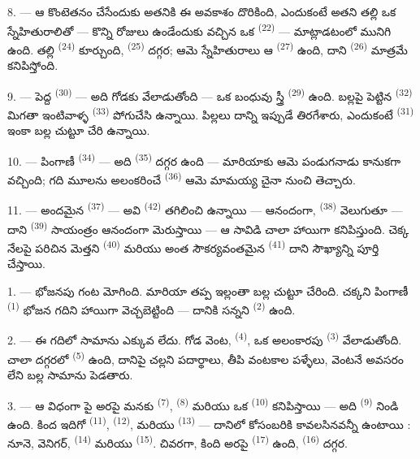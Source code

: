 8. --- ఆ కొంటెతనం చేసేందుకు అతనికి ఈ అవకాశం దొరికింది, ఎందుకంటే అతని తల్లి ఒక స్నేహితురాలితో —
కొన్ని రోజులు ఉండేందుకు వచ్చిన ఒక  \textsuperscript{(22)} — మాట్లాడటంలో మునిగి
ఉంది. తల్లి  \textsuperscript{(24)} కూర్చుంది, 
\textsuperscript{(25)} దగ్గర; ఆమె స్నేహితురాలు ఆ  \textsuperscript{(27)}
ఉంది, దాని  \textsuperscript{(26)} మాత్రమే కనిపిస్తోంది.

9. --- పెద్ద  \textsuperscript{(30)} — అది గోడకు వేలాడుతోంది — ఒక బంధువు
స్త్రీ  \textsuperscript{(29)} ఉంది. బల్లపై పెట్టిన 
\textsuperscript{(32)} మిగతా ఇంటివాళ్ళ  \textsuperscript{(33)} పోగుచేసి
ఉన్నాయి. పిల్లలు దాన్ని ఇప్పుడే తిరగేశారు, ఎందుకంటే  \textsuperscript{(31)}
ఇంకా బల్ల చుట్టూ చేరి ఉన్నాయి.

10. --- పింగాణీ  \textsuperscript{(34)} — అది 
\textsuperscript{(35)} దగ్గర ఉంది — మారియాకు ఆమె పండుగనాడు కానుకగా వచ్చింది; గది మూలను
అలంకరించే  \textsuperscript{(36)} ఆమె మామయ్య చైనా నుంచి తెచ్చారు.

11. --- అందమైన  \textsuperscript{(37)} — అవి 
\textsuperscript{(42)} తగిలించి ఉన్నాయి — ఆనందంగా, 
\textsuperscript{(38)} వెలుగుతూ — దాని  \textsuperscript{(39)}
సాయంత్రం ఆనందంగా మెరుస్తాయి — ఆ సావిడి చాలా హాయిగా కనిపిస్తుంది. చెక్క నేలపై పరిచిన మెత్తని
 \textsuperscript{(40)} మరియు అంత సౌకర్యవంతమైన 
\textsuperscript{(41)} దాని సౌఖ్యాన్ని పూర్తి చేస్తాయి.

\VUsaut{3.6mm}
\VUsaut{3.0mm}

1. --- భోజనపు గంట మోగింది. మారియా తప్ప ఇల్లంతా బల్ల చుట్టూ చేరింది. చక్కని పింగాణీ
 \textsuperscript{(1)} భోజన గదిని హాయిగా వెచ్చబెట్టింది — దానికి సన్నని
 \textsuperscript{(2)} ఉంది.

2. --- ఈ గదిలో సామాను ఎక్కువ లేదు. గోడ వెంట,  \textsuperscript{(4)}, ఒక
అలంకారపు  \textsuperscript{(3)} వేలాడుతోంది. చాలా దగ్గరలో
 \textsuperscript{(5)} ఉంది, దానిపై చల్లని పదార్థాలు, తీపి వంటకాల
పళ్ళేలు, వెంటనే అవసరం లేని బల్ల సామాను పెడతారు.

3. --- ఆ విధంగా పై అరపై మనకు  \textsuperscript{(7)}, 
\textsuperscript{(8)} మరియు ఒక  \textsuperscript{(10)} కనిపిస్తాయి — అది
 \textsuperscript{(9)} నిండి ఉంది. కింద ఇదిగో 
\textsuperscript{(11)},  \textsuperscript{(12)}, మరియు 
\textsuperscript{(13)} — దానిలో కోసంబరికి కావలసినవన్నీ ఉంటాయి : నూనె, వెనిగర్, 
\textsuperscript{(14)} మరియు  \textsuperscript{(15)}. చివరగా, కింది అరపై
 \textsuperscript{(17)} ఉంది,  \textsuperscript{(16)} దగ్గర.

